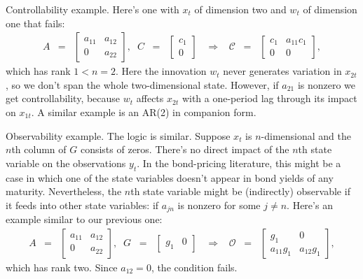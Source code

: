 \documentclass[11pt]{article}
\begin{document}
{Controllability example.
Here's one with $x_t$ of dimension two and $w_t$ of dimension one that fails:
\begin{eqnarray*}
    A &=&
    \left[
    \begin{array}{cc}
        a_{11} & a_{12} \\ 0 & a_{22}
    \end{array}
    \right],
    \;\;
    C \;\;=\;\;
    \left[
    \begin{array}{c}
        c_{1} \\ 0
    \end{array}
    \right]
    \;\;\;\Rightarrow \;\;\;
    \mathcal{C} \;\;=\;\;
    \left[
    \begin{array}{cc}
        c_{1} & a_{11} c_1 \\ 0 & 0
    \end{array}
    \right] ,
\end{eqnarray*}
which has rank $1 < n=2 $.
Here the innovation $w_t$ never generates variation in $x_{2t}$,
so we don't span the whole two-dimensional state.
However, if $a_{21}$ is nonzero we get controllability,
because $w_t$ affects $x_{2t}$ with a one-period lag through its impact on $x_{1t}$.
A similar example is an AR(2) in companion form.

Observability example.  The logic is similar.
Suppose $x_t$ is $n$-dimensional and the $n$th column of $G$
consists of zeros.
There's no direct impact of the $n$th state variable on
the observations $y_t$.
In the bond-pricing literature,
this might be a case in which one of the state variables
doesn't appear in bond yields of any maturity.
Nevertheless, the $n$th state variable might be (indirectly)
observable if it feeds into other state variables:
if $a_{jn}$ is nonzero for some $j\neq n$.
Here's an example similar to our previous one:
\begin{eqnarray*}
    A &=&
    \left[
    \begin{array}{cc}
        a_{11} & a_{12} \\  0 & a_{22}
    \end{array}
    \right],
    \;\;
    G \;\;=\;\;
    \left[
    \begin{array}{cc}
        g_{1} &  0
    \end{array}
    \right]
    \;\;\;\Rightarrow \;\;\;
    \mathcal{O} \;\;=\;\;
    \left[
    \begin{array}{cc}
        g_{1} & 0 \\ a_{11} g_1 & a_{12} g_1
    \end{array}
    \right] ,
\end{eqnarray*}
which has rank two.
Since $a_{12} = 0$, the condition fails.

}
\end{document}
